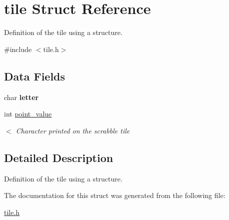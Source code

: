 \hypertarget{structtile}{\section{tile Struct Reference}
\label{structtile}
}


Definition of the tile using a structure.  




{\ttfamily \#include $<$tile.\-h$>$}

\subsection*{Data Fields}
\begin{DoxyCompactItemize}
\item 
\hypertarget{structtile_a4c445fb46647cb464c0571b3ca21948e}{char {\bfseries letter}}\label{structtile_a4c445fb46647cb464c0571b3ca21948e}

\item 
\hypertarget{structtile_a1b76ad85a534296d9ea5f418b244ad4e}{int \hyperlink{structtile_a1b76ad85a534296d9ea5f418b244ad4e}{point\-\_\-value}}\label{structtile_a1b76ad85a534296d9ea5f418b244ad4e}

\begin{DoxyCompactList}\small\item\em $<$ Character printed on the scrabble tile \end{DoxyCompactList}\end{DoxyCompactItemize}


\subsection{Detailed Description}
Definition of the tile using a structure. 

The documentation for this struct was generated from the following file\-:\begin{DoxyCompactItemize}
\item 
\hyperlink{tile_8h}{tile.\-h}\end{DoxyCompactItemize}
